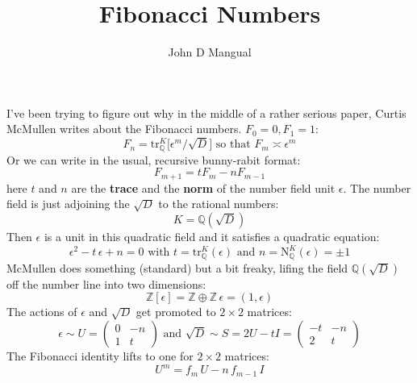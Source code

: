 \documentclass[12pt]{article}
\title{Fibonacci Numbers}
\author{John D Mangual}
\date{}
\begin{document}
\selectfont \fontsize{12.5}{15}\selectfont

\maketitle

\noindent I've been trying to figure out why in the middle of a rather serious paper, Curtis McMullen writes about the Fibonacci numbers.  $F_0 = 0, F_1 = 1$:
$$ F_n = \mathrm{tr}_\mathbb{Q}^K \big[ \epsilon^m / \sqrt{D} \big]  \text{ so that } F_m \asymp \epsilon^m $$ 
Or we can write in the usual, recursive bunny-rabit format:
$$ F_{m+1} = t F_m - n F_{m-1} $$
here $t$ and $n$ are the \textbf{trace} and the \textbf{norm} of the number field unit $\epsilon$.  The number field is just adjoining the $\sqrt{D}$ to the rational numbers:
$$ K = \mathbb{Q}(\sqrt{D})  $$
Then $\epsilon$ is a unit in this quadratic field and it satisfies a quadratic equation:
$$ \epsilon^2 - t \, \epsilon + n = 0 \text{ with } t = \mathrm{tr}_\mathbb{Q}^K (\epsilon) \text{ and } n = \mathrm{N}_\mathbb{Q}^K (\epsilon)  = \pm 1 $$
McMullen does something (standard) but a bit freaky, lifing the field $\mathbb{Q}(\sqrt{D})$ off the number line into two dimensions:
$$ \mathbb{Z}[\epsilon] = \mathbb{Z} \oplus \mathbb{Z}\, \epsilon = (1, \epsilon) $$
The actions of $\epsilon$ and $\sqrt{D}$ get promoted to $2 \times 2$ matrices:
$$ \epsilon \sim U = \left( \begin{array}{cr} 0 & -n \\ 1 & t \end{array}  \right)
\text{ and } \sqrt{D} \sim S = 2U - tI =  \left( \begin{array}{cr} -t & -n \\ 2 & t \end{array}  \right) $$
The Fibonacci identity lifts to one for $2 \times 2$ matrices:
$$ U^m = f_m \, U - n \, f_{m-1} \, I  $$


\newpage
\end{document}
